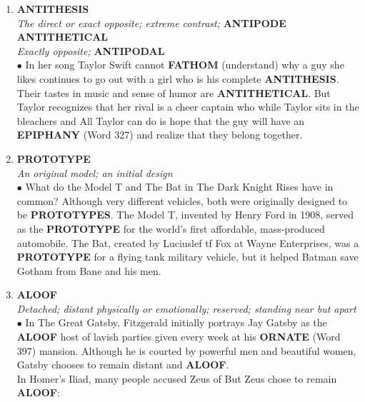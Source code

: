 \documentclass{book}
\begin{document}
\begin{enumerate}
\item \textbf{ANTITHESIS}\\ \textit{The direct or exact opposite; extreme contrast;} \textbf{ANTIPODE}\\ \textbf{ANTITHETICAL}\\ \textit{Exactly opposite;} \textbf{ANTIPODAL}\\
 
 $\bullet$ In her song  Taylor Swift cannot \textbf{FATHOM} (understand) why a guy she likes continues to go out with a girl who is his complete \textbf{ANTITHESIS}. Their tastes in music and sense of humor are \textbf{ANTITHETICAL}. But Taylor recognizes that her rival is a cheer captain who  while Taylor sits in the bleachers and   All Taylor can do is hope that the guy will have an \textbf{EPIPHANY} (Word 327) and realize that they belong together.

\item \textbf{PROTOTYPE}\\ 
\textit{An original model; an initial design}\\ 

$\bullet$ What do the Model T and The Bat in The Dark Knight Rises have in common? Although very different vehicles, both were originally designed to be \textbf{PROTOTYPES}. The Model T, invented by Henry Ford in 1908, served as the \textbf{PROTOTYPE} for the world's first affordable, mass-produced automobile. The Bat, created by Luciuslef tf Fox at Wayne Enterprises, was a \textbf{PROTOTYPE} for a flying tank military vehicle, but it helped Batman save Gotham from Bane and his men.

\item \textbf{ALOOF}\\
\textit{Detached; distant physically or emotionally; reserved; standing near but apart}\\

$\bullet$ In The Great Gatsby, Fitzgerald initially portrays Jay Gatsby as the \textbf{ALOOF} host of lavish parties given every week at his \textbf{ORNATE} (Word 397) mansion. Although he is courted by powerful men and beautiful women, Gatsby chooses to remain distant and \textbf{ALOOF}.\\

 In Homer's Iliad, many people accused Zeus of  But Zeus chose to remain \textbf{ALOOF}: 
 

\end{enumerate}
\end{document}

